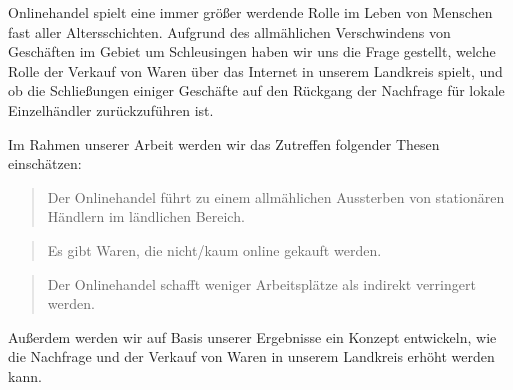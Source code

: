 


Onlinehandel spielt eine immer größer werdende Rolle im Leben von Menschen fast aller Altersschichten. Aufgrund des allmählichen Verschwindens von Geschäften im Gebiet um Schleusingen haben wir uns die Frage gestellt, welche Rolle der Verkauf von Waren über das Internet in unserem Landkreis spielt, und ob die Schließungen einiger Geschäfte auf den Rückgang der Nachfrage für lokale Einzelhändler zurückzuführen ist.

Im Rahmen unserer Arbeit werden wir das Zutreffen folgender Thesen einschätzen:
\begin{quote}
     Der Onlinehandel führt zu einem allmählichen Aussterben von stationären Händlern im ländlichen Bereich.
\end{quote}

\begin{quote}
     Es gibt Waren, die nicht/kaum online gekauft werden.
\end{quote}

\begin{quote}
     Der Onlinehandel schafft weniger Arbeitsplätze als indirekt verringert werden.
\end{quote}

Außerdem werden wir auf Basis unserer Ergebnisse ein Konzept entwickeln, wie die Nachfrage und der Verkauf von Waren in unserem Landkreis erhöht werden kann.
